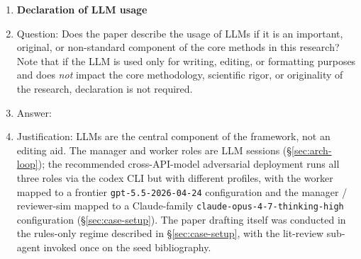 \begin{enumerate}
\item {\bf Declaration of LLM usage}
    \item[] Question: Does the paper describe the usage of LLMs if it is an important, original, or non-standard component of the core methods in this research? Note that if the LLM is used only for writing, editing, or formatting purposes and does \emph{not} impact the core methodology, scientific rigor, or originality of the research, declaration is not required.
    \item[] Answer: \answerYes{}
    \item[] Justification: LLMs are the central component of the framework, not an editing aid. The manager and worker roles are LLM sessions (\S\ref{sec:arch-loop}); the recommended cross-API-model adversarial deployment runs all three roles via the codex CLI but with different profiles, with the worker mapped to a frontier \texttt{gpt-5.5-2026-04-24} configuration and the manager / reviewer-sim mapped to a Claude-family \texttt{claude-opus-4-7-thinking-high} configuration (\S\ref{sec:case-setup}). The paper drafting itself was conducted in the rules-only regime described in \S\ref{sec:case-setup}, with the lit-review sub-agent invoked once on the seed bibliography.

\end{enumerate}
